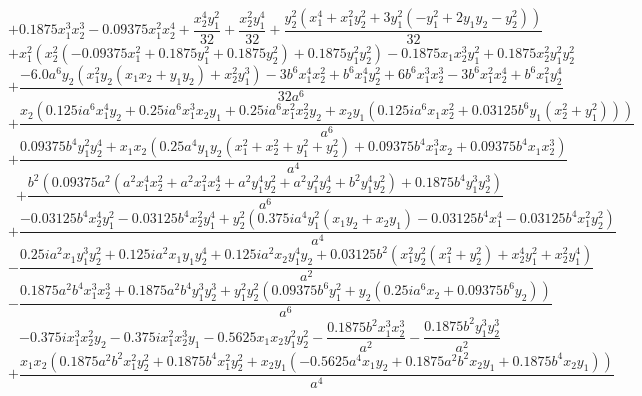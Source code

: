 $$+0.1875 x_{1}^{3} x_{2}^{3} - 0.09375 x_{1}^{2} x_{2}^{4} + \frac{x_{2}^{4} y_{1}^{2}}{32} + \frac{x_{2}^{2} y_{1}^{4}}{32} + \frac{y_{2}^{2} \left(x_{1}^{4} + x_{1}^{2} y_{2}^{2} + 3 y_{1}^{2} \left(- y_{1}^{2} + 2 y_{1} y_{2} - y_{2}^{2}\right)\right)}{32}$$
$$+x_{1}^{2} \left(x_{2}^{2} \left(- 0.09375 x_{1}^{2} + 0.1875 y_{1}^{2} + 0.1875 y_{2}^{2}\right) + 0.1875 y_{1}^{2} y_{2}^{2}\right) - 0.1875 x_{1} x_{2}^{3} y_{1}^{2} + 0.1875 x_{2}^{2} y_{1}^{2} y_{2}^{2}$$
$$+\frac{- 6.0 a^{6} y_{2} \left(x_{1}^{2} y_{2} \left(x_{1} x_{2} + y_{1} y_{2}\right) + x_{2}^{2} y_{1}^{3}\right) - 3 b^{6} x_{1}^{4} x_{2}^{2} + b^{6} x_{1}^{4} y_{2}^{2} + 6 b^{6} x_{1}^{3} x_{2}^{3} - 3 b^{6} x_{1}^{2} x_{2}^{4} + b^{6} x_{1}^{2} y_{2}^{4}}{32 a^{6}}$$
$$+\frac{x_{2} \left(0.125 i a^{6} x_{1}^{4} y_{2} + 0.25 i a^{6} x_{1}^{3} x_{2} y_{1} + 0.25 i a^{6} x_{1}^{2} x_{2}^{2} y_{2} + x_{2} y_{1} \left(0.125 i a^{6} x_{1} x_{2}^{2} + 0.03125 b^{6} y_{1} \left(x_{2}^{2} + y_{1}^{2}\right)\right)\right)}{a^{6}}$$
$$+\frac{0.09375 b^{4} y_{1}^{2} y_{2}^{4} + x_{1} x_{2} \left(0.25 a^{4} y_{1} y_{2} \left(x_{1}^{2} + x_{2}^{2} + y_{1}^{2} + y_{2}^{2}\right) + 0.09375 b^{4} x_{1}^{3} x_{2} + 0.09375 b^{4} x_{1} x_{2}^{3}\right)}{a^{4}}$$
$$+\frac{b^{2} \left(0.09375 a^{2} \left(a^{2} x_{1}^{4} x_{2}^{2} + a^{2} x_{1}^{2} x_{2}^{4} + a^{2} y_{1}^{4} y_{2}^{2} + a^{2} y_{1}^{2} y_{2}^{4} + b^{2} y_{1}^{4} y_{2}^{2}\right) + 0.1875 b^{4} y_{1}^{3} y_{2}^{3}\right)}{a^{6}}$$
$$+\frac{- 0.03125 b^{4} x_{2}^{4} y_{1}^{2} - 0.03125 b^{4} x_{2}^{2} y_{1}^{4} + y_{2}^{2} \left(0.375 i a^{4} y_{1}^{2} \left(x_{1} y_{2} + x_{2} y_{1}\right) - 0.03125 b^{4} x_{1}^{4} - 0.03125 b^{4} x_{1}^{2} y_{2}^{2}\right)}{a^{4}}$$
$$- \frac{0.25 i a^{2} x_{1} y_{1}^{3} y_{2}^{2} + 0.125 i a^{2} x_{1} y_{1} y_{2}^{4} + 0.125 i a^{2} x_{2} y_{1}^{4} y_{2} + 0.03125 b^{2} \left(x_{1}^{2} y_{2}^{2} \left(x_{1}^{2} + y_{2}^{2}\right) + x_{2}^{4} y_{1}^{2} + x_{2}^{2} y_{1}^{4}\right)}{a^{2}}$$
$$- \frac{0.1875 a^{2} b^{4} x_{1}^{3} x_{2}^{3} + 0.1875 a^{2} b^{4} y_{1}^{3} y_{2}^{3} + y_{1}^{2} y_{2}^{2} \left(0.09375 b^{6} y_{1}^{2} + y_{2} \left(0.25 i a^{6} x_{2} + 0.09375 b^{6} y_{2}\right)\right)}{a^{6}}$$
$$- 0.375 i x_{1}^{3} x_{2}^{2} y_{2} - 0.375 i x_{1}^{2} x_{2}^{3} y_{1} - 0.5625 x_{1} x_{2} y_{1}^{2} y_{2}^{2} - \frac{0.1875 b^{2} x_{1}^{3} x_{2}^{3}}{a^{2}} - \frac{0.1875 b^{2} y_{1}^{3} y_{2}^{3}}{a^{2}}$$
$$+\frac{x_{1} x_{2} \left(0.1875 a^{2} b^{2} x_{1}^{2} y_{2}^{2} + 0.1875 b^{4} x_{1}^{2} y_{2}^{2} + x_{2} y_{1} \left(- 0.5625 a^{4} x_{1} y_{2} + 0.1875 a^{2} b^{2} x_{2} y_{1} + 0.1875 b^{4} x_{2} y_{1}\right)\right)}{a^{4}}$$
